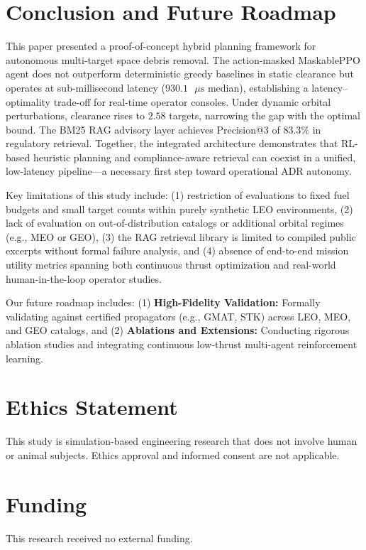\documentclass[10pt,conference,a4paper]{IEEEtran}
\begin{document}
\section{Conclusion and Future Roadmap}
This paper presented a proof-of-concept hybrid planning framework for autonomous multi-target space debris removal. The action-masked MaskablePPO agent does not outperform deterministic greedy baselines in static clearance but operates at sub-millisecond latency ($930.1\text{ }\mu\text{s}$ median), establishing a latency--optimality trade-off for real-time operator consoles. Under dynamic orbital perturbations, clearance rises to $2.58$ targets, narrowing the gap with the optimal bound. The BM25 RAG advisory layer achieves Precision@3 of $83.3\%$ in regulatory retrieval. Together, the integrated architecture demonstrates that RL-based heuristic planning and compliance-aware retrieval can coexist in a unified, low-latency pipeline---a necessary first step toward operational ADR autonomy.

Key limitations of this study include: (1) restriction of evaluations to fixed fuel budgets and small target counts within purely synthetic LEO environments, (2) lack of evaluation on out-of-distribution catalogs or additional orbital regimes (e.g., MEO or GEO), (3) the RAG retrieval library is limited to compiled public excerpts without formal failure analysis, and (4) absence of end-to-end mission utility metrics spanning both continuous thrust optimization and real-world human-in-the-loop operator studies.

Our future roadmap includes: (1) \textbf{High-Fidelity Validation:} Formally validating against certified propagators (e.g., GMAT, STK) across LEO, MEO, and GEO catalogs, and (2) \textbf{Ablations and Extensions:} Conducting rigorous ablation studies and integrating continuous low-thrust multi-agent reinforcement learning.




\section*{Ethics Statement}
This study is simulation-based engineering research that does not involve human or animal subjects. Ethics approval and informed consent are not applicable.

\section*{Funding}
This research received no external funding.
\end{document}
